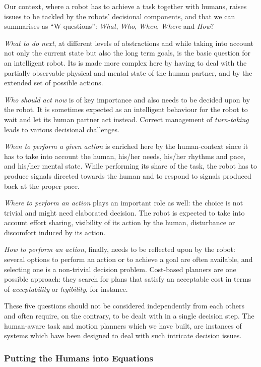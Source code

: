 \documentclass[preprint,3p,times]{elsarticle}
\begin{document}
Our context, where a robot has to achieve a task together with
humans, raises issues to be tackled by the robots' decisional components, and
that we can summarises as ``W-questions'': \emph{What}, \emph{Who}, \emph{When},
\emph{Where} and \emph{How}?

\emph{What to do next}, at different levels of abstractions and while taking
into account not only the current state but also the long term goals, is the
basic question for an intelligent robot. Its is made more complex here by having
to deal with the partially observable physical and mental state of the human
partner, and by the extended set of possible actions.

\emph{Who should act now} is of key importance and also needs to be
decided upon by the robot. It is sometimes expected as an intelligent behaviour
for the robot to wait and let its human partner act instead. Correct management
of \emph{turn-taking} leads to various decisional challenges.

\emph{When to perform a given action} is enriched here by the human-context
since it has to take into account the human, his/her needs, his/her rhythms and
pace, and his/her mental state. While performing its share of the task, the
robot has to produce signals directed towards the human and to respond to
signals produced back at the proper pace.

\emph{Where to perform an action} plays an important role as well: the choice is
not trivial and might need elaborated decision. The robot is expected to take
into account effort sharing, visibility of its action by the human, disturbance
or discomfort induced by its action.

\emph{How to perform an action}, finally, needs to be reflected upon by the
robot: several options to perform an action or to achieve a goal are often
available, and selecting one is a non-trivial decision problem. Cost-based
planners are one possible approach: they search for plans that satisfy an
acceptable cost in terms of \emph{acceptability} or \emph{legibility}, for
instance.

These five questions should not be considered independently from each others and
often require, on the contrary, to be dealt with in a single decision step. The
human-aware task and motion planners which we have built, are instances of
systems which have been designed to deal with such intricate decision issues.

\subsubsection{Putting the Humans into Equations}
\end{document}
